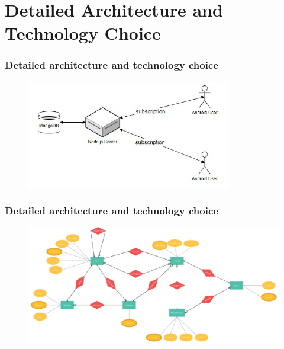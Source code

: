 \documentclass[aspectratio=169]{beamer}
\begin{document}
\section{Detailed Architecture and Technology Choice}
\begin{frame}
	\frametitle{Detailed architecture and technology choice}
	 \begin{figure}
		\centering
		\includegraphics[width=0.8\textwidth]{media/architecture.jpg}
	\end{figure}
\end{frame}

\begin{frame}
	\frametitle{Detailed architecture and technology choice}
	 \begin{figure}
		\centering
		\includegraphics[width=1\textwidth]{media/entity-relationship-diagram.pdf}
	\end{figure}
\end{frame}
\end{document}
